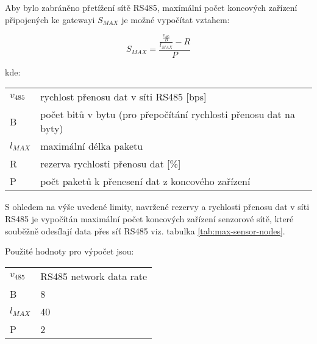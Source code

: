 Aby bylo zabráněno přetížení sítě RS485, maxímální počet koncových zařízení připojených ke gatewayi $ S_{MAX} $ je možné vypočítat vztahem:

\begin{equation}
S_{MAX} = \frac{\frac{\frac{v_{485}}{B}}{l_{MAX}} - R}{P}
\label{equ:max-count-of-sensors}
\end{equation}

kde:

\begin{tabular}{l @{  } l}
$v_{485}$ & rychlost přenosu dat v síti RS485 [bps]\\
 B        & počet bitů v bytu (pro přepočítání rychlosti přenosu dat na byty) \\
$l_{MAX}$ & maximální délka paketu \\
 R        & rezerva rychlosti přenosu dat [\%]\\
 P        & počt paketů k přenesení dat z koncového zařízení \\
\end{tabular}


S ohledem na výše uvedené limity, navržené rezervy a rychlosti přenosu dat v síti RS485 je vypočítán maximální počet koncových zařízení senzorové sítě, které souběžně odesílají data přes síť RS485 viz. tabulka \ref{tab:max-sensor-nodes}.

Použité hodnoty pro výpočet jsou:

\begin{tabular}{l @{ $=$ } l}
$v_{485}$ & RS485 network data rate \\
 B        & 8 \\
$l_{MAX}$ & 40 \\
 P        & 2 \\
\end{tabular}

